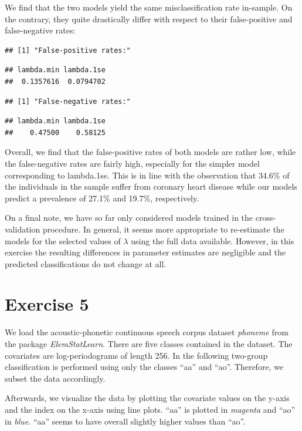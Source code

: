 \documentclass[
]{article}
\begin{document}
We find that the two models yield the same misclassification rate
in-sample. On the contrary, they quite drastically differ with respect
to their false-positive and false-negative rates:

\begin{verbatim}
## [1] "False-positive rates:"
\end{verbatim}

\begin{verbatim}
## lambda.min lambda.1se 
##  0.1357616  0.0794702
\end{verbatim}

\begin{verbatim}
## [1] "False-negative rates:"
\end{verbatim}

\begin{verbatim}
## lambda.min lambda.1se 
##    0.47500    0.58125
\end{verbatim}

Overall, we find that the false-positive rates of both models are rather
low, while the false-negative rates are fairly high, especially for the
simpler model corresponding to lambda.1se. This is in line with the
observation that 34.6\% of the individuals in the sample suffer from
coronary heart disease while our models predict a prevalence of 27.1\%
and 19.7\%, respectively.

On a final note, we have so far only considered models trained in the
cross-validation procedure. In general, it seems more appropriate to
re-estimate the models for the selected values of \(\lambda\) using the
full data available. However, in this exercise the resulting differences
in parameter estimates are negligible and the predicted classifications
do not change at all.

\hypertarget{exercise-5}{%
\section{Exercise 5}\label{exercise-5}}

We load the acoustic-phonetic continuous speech corpus dataset
\textit{phoneme} from the package \textit{ElemStatLearn}. There are five
classes contained in the dataset. The covariates are log-periodograms of
length 256. In the following two-group classification is performed using
only the classes ``aa'' and ``ao''. Therefore, we subset the data
accordingly.

Afterwards, we visualize the data by plotting the covariate values on
the y-axis and the index on the x-axis using line plots. ``aa'' is
plotted in \textit{magenta} and ``ao'' in \textit{blue}. ``aa'' seems to
have overall slightly higher values than ``ao''.
\end{document}
